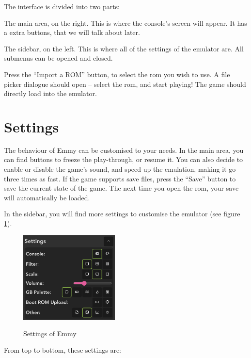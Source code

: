 The interface is divided into two parts:

\begin{compactitem}
	\item The main area, on the right. This is where the console's screen will appear. It has a extra buttons, that we will talk about later.
	\item The sidebar, on the left. This is where all of the settings of the emulator are. All submenus can be opened and closed.
\end{compactitem}


Press the ``Import a ROM'' button, to select the \gls{rom} you wish to use. A file picker dialogue should open -- select the \gls{rom}, and start playing! The game should directly load into the emulator.

\section{Settings}

The behaviour of Emmy can be customised to your needs. In the main area, you can find buttons to freeze the play-through, or resume it. You can also decide to enable or disable the game's sound, and speed up the emulation, making it go three times as fast. If the game supports save files, press the ``Save'' button to save the current state of the game. The next time you open the \gls{rom}, your save will automatically be loaded.

In the sidebar, you will find more settings to customise the emulator (see figure \ref{fig:emmy-settings}).

\begin{figure}[h]
    \centering
    \includegraphics[width=5cm]{images/emmy-settings}\\
    \caption{Settings of Emmy}
    \label{fig:emmy-settings}
\end{figure}

From top to bottom, these settings are:

